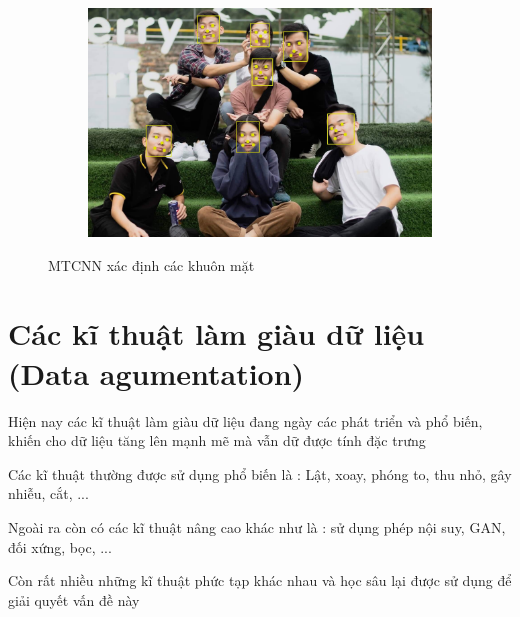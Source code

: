 \begin{figure}
    \begin{subfigure}{1.\textwidth}
        \begin{center}
            \includegraphics[width=1.\linewidth]{Chapters/items/chap2_14.jpg}
        \end{center}
        \label{fig:chap2_14}
    \end{subfigure}
    \caption{MTCNN xác định các khuôn mặt}
\end{figure}

\newpage
\section{Các kĩ thuật làm giàu dữ liệu (Data agumentation)}

Hiện nay các kĩ thuật làm giàu dữ liệu đang ngày các phát triển và phổ biến, khiến cho dữ liệu tăng lên
mạnh mẽ mà vẫn dữ được tính đặc trưng

Các kĩ thuật thường được sử dụng phổ biến là : Lật, xoay, phóng to, thu nhỏ, gây nhiễu, cắt, ...   

Ngoài ra còn có các kĩ thuật nâng cao khác như là : sử dụng phép nội suy, GAN, đối xứng, bọc, ...

Còn rất nhiều những kĩ thuật phức tạp khác nhau và học sâu lại được sử dụng để giải quyết vấn đề này


